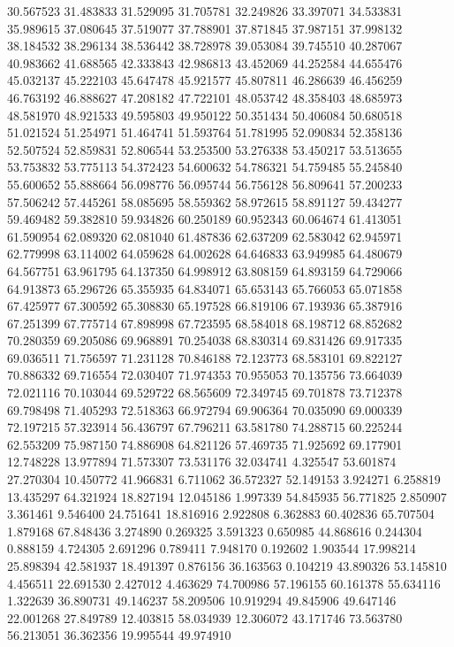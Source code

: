 30.567523
31.483833
31.529095
31.705781
32.249826
33.397071
34.533831
35.989615
37.080645
37.519077
37.788901
37.871845
37.987151
37.998132
38.184532
38.296134
38.536442
38.728978
39.053084
39.745510
40.287067
40.983662
41.688565
42.333843
42.986813
43.452069
44.252584
44.655476
45.032137
45.222103
45.647478
45.921577
45.807811
46.286639
46.456259
46.763192
46.888627
47.208182
47.722101
48.053742
48.358403
48.685973
48.581970
48.921533
49.595803
49.950122
50.351434
50.406084
50.680518
51.021524
51.254971
51.464741
51.593764
51.781995
52.090834
52.358136
52.507524
52.859831
52.806544
53.253500
53.276338
53.450217
53.513655
53.753832
53.775113
54.372423
54.600632
54.786321
54.759485
55.245840
55.600652
55.888664
56.098776
56.095744
56.756128
56.809641
57.200233
57.506242
57.445261
58.085695
58.559362
58.972615
58.891127
59.434277
59.469482
59.382810
59.934826
60.250189
60.952343
60.064674
61.413051
61.590954
62.089320
62.081040
61.487836
62.637209
62.583042
62.945971
62.779998
63.114002
64.059628
64.002628
64.646833
63.949985
64.480679
64.567751
63.961795
64.137350
64.998912
63.808159
64.893159
64.729066
64.913873
65.296726
65.355935
64.834071
65.653143
65.766053
65.071858
67.425977
67.300592
65.308830
65.197528
66.819106
67.193936
65.387916
67.251399
67.775714
67.898998
67.723595
68.584018
68.198712
68.852682
70.280359
69.205086
69.968891
70.254038
68.830314
69.831426
69.917335
69.036511
71.756597
71.231128
70.846188
72.123773
68.583101
69.822127
70.886332
69.716554
72.030407
71.974353
70.955053
70.135756
73.664039
72.021116
70.103044
69.529722
68.565609
72.349745
69.701878
73.712378
69.798498
71.405293
72.518363
66.972794
69.906364
70.035090
69.000339
72.197215
57.323914
56.436797
67.796211
63.581780
74.288715
60.225244
62.553209
75.987150
74.886908
64.821126
57.469735
71.925692
69.177901
12.748228
13.977894
71.573307
73.531176
32.034741
4.325547
53.601874
27.270304
10.450772
41.966831
6.711062
36.572327
52.149153
3.924271
6.258819
13.435297
64.321924
18.827194
12.045186
1.997339
54.845935
56.771825
2.850907
3.361461
9.546400
24.751641
18.816916
2.922808
6.362883
60.402836
65.707504
1.879168
67.848436
3.274890
0.269325
3.591323
0.650985
44.868616
0.244304
0.888159
4.724305
2.691296
0.789411
7.948170
0.192602
1.903544
17.998214
25.898394
42.581937
18.491397
0.876156
36.163563
0.104219
43.890326
53.145810
4.456511
22.691530
2.427012
4.463629
74.700986
57.196155
60.161378
55.634116
1.322639
36.890731
49.146237
58.209506
10.919294
49.845906
49.647146
22.001268
27.849789
12.403815
58.034939
12.306072
43.171746
73.563780
56.213051
36.362356
19.995544
49.974910
